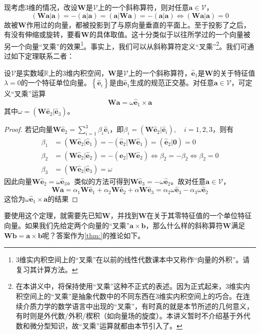 \documentclass[main.tex]{subfiles}
\begin{document}
现考虑3维的情况，改设$\mathbf{W}$是$\mathcal{V}$上的一个斜称算符，则对任意$\mathbf{a}\in\mathcal{V}$，
\[\left(\mathbf{Wa}|\mathbf{a}\right)=-\left(\mathbf{a}|\mathbf{a}\right)=\left(\mathbf{a}|\mathbf{Wa}\right)=-\left(\mathbf{a}|\mathbf{a}\right)\Leftrightarrow\left(\mathbf{Wa}|\mathbf{a}\right)=0\]
故被$\mathbf{W}$作用过的向量，都被投影到了与原向量垂直的平面上。至于投影了之后，有没有伸缩或旋转，要看$\mathbf{W}$的具体取值。这十分类似于以往所学过的一个向量被另一个向量“叉乘”的效果\footnote{3维实内积空间上的“叉乘”在以前的线性代数课本中又称作“向量的外积”\cite[\S3.2]{周胜林2012线性代数}。请复习其计算方法。}。事实上，我们可以从斜称算符定义“叉乘”\footnote{在本讲义中，将保持使用“叉乘”这种不正式的表述。因为正式起来，3维实内积空间上的“叉乘”是抽象代数中的不同东西在3维实内积空间上的巧合。在连续介质力学的数学语言中出现的“叉乘”，有时真的就是本节所述的几何意义，有时则是外代数/外积/楔积（如向量场的旋度）。本讲义暂时不介绍基于外代数和微分型知识，故“叉乘”运算就都由本节引入了。}。我们可通过如下定理联系二者：

\begin{theorem}
    设$\mathcal{V}$是实数域$\mathbb{R}$上的3维内积空间，$\mathbf{W}$是$\mathcal{V}$上的一个斜称算符，$\mathbf{\hat{e}}_1$是$\mathbf{W}$的关于特征值$\lambda=0$的一个特征单位向量。$\left\{\mathbf{\hat{e}}_i\right\}$是由$\mathbf{\hat{e}}_1$生成的规范正交基。对任意$\mathbf{a}\in\mathcal{V}$，可定义“叉乘”运算
    \[\mathbf{Wa}=\omega\mathbf{\hat{e}}_1\times\mathbf{a}\]
    其中$\omega=\left(\mathbf{W\hat{e}}_2|\mathbf{\hat{e}}_3\right)$。
\end{theorem}
\begin{proof}
    若记向量$\mathbf{W\hat{e}}_2=\sum_{i=1}^3\beta_i\mathbf{\hat{e}}_i$，即$\beta_i=\left(\mathbf{W\hat{e}}_2|\mathbf{\hat{e}}_i\right),\quad i=1,2,3$，则有
    \begin{align*}
        \beta_1 & =\left(\mathbf{W\hat{e}}_2|\mathbf{\hat{e}}_1\right)=-\left(\mathbf{\hat{e}}_2|\mathbf{W\hat{e}}_1\right)=\left(\mathbf{\hat{e}}_2|\mathbf{0}\right)=0     \\
        \beta_2 & =\left(\mathbf{W\hat{e}}_2|\mathbf{\hat{e}}_2\right)=-\left(\mathbf{e}_2|\mathbf{W\hat{e}}_2\right)\Leftrightarrow\beta_2=-\beta_2\Leftrightarrow\beta_2=0 \\
        \beta_3 & =\left(\mathbf{W\hat{e}}_2|\mathbf{\hat{e}}_3\right)=\omega
    \end{align*}
    因此向量$\mathbf{W\hat{e}}_2=\omega\mathbf{\hat{e}}_3$。类似的方法可得到$\mathbf{W\hat{e}}_3=-\omega\mathbf{\hat{e}}_2$。故对任意$\mathbf{a}\in\mathcal{V}$，
    \[
        \mathbf{Wa}=\alpha_1\mathbf{W\hat{e}}_1+\alpha_2\mathbf{W\hat{e}}_2+\alpha\mathbf{W\hat{e}}_3=\alpha_2\omega\mathbf{\hat{e}}_3-\alpha_3\omega\mathbf{\hat{e}}_2
    \]
    这恰为$\omega\mathbf{\hat{e}}_1\times\mathbf{a}$的结果
\end{proof}
要使用这个定理，就需要先已知$\mathbf{W}$，并找到$\mathbf{W}$在关于其零特征值的一个单位特征向量。如果我们先给定两个向量的“叉乘”$\mathbf{a}\times\mathbf{b}$，那么什么样的斜称算符$\mathbf{W}$满足$\mathbf{Wb}=\mathbf{a}\times\mathbf{b}$呢？答案作为\ref{thm:}的推论如下。
\end{document}
